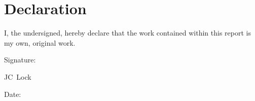 \chapter{Declaration}

I, the undersigned, hereby declare that the work contained within this report is my own, original work.\par
\vspace{1.5cm}

\noindent%
\parbox{.5\textwidth}{%
  Signature:\quad\dotfill\par
  \hfill JC\ Lock\hspace{1.8cm}\null}\vspace{1cm}
\newline

\vspace{1.5cm}
\noindent%
\parbox{.5\textwidth}{%
  Date:\quad\dotfill\par}
